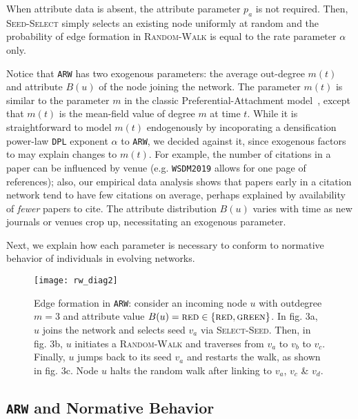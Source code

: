 When attribute data is absent, the attribute parameter $p_a$ is not required.
Then, \textsc{Seed-Select} simply selects an existing node uniformly at random
and the probability of edge formation in \textsc{Random-Walk} is equal to
the rate parameter $\alpha$ only.

Notice that \texttt{ARW} has two exogenous parameters:  the average out-degree $m(t)$ and attribute $B(u)$ of the node joining the network. The parameter $m(t)$ is similar to the parameter $m$ in the classic Preferential-Attachment model~\cite{barabasi1999emergence}, except that $m(t)$ is the mean-field value of degree $m$ at time $t$. While it is straightforward to model $m(t)$ endogenously by incoporating a densification power-law \texttt{DPL} exponent $\alpha$ to \texttt{ARW}, we decided against it, since exogenous factors to may explain changes to $m(t)$. For example, the number of citations in a paper can be influenced by venue (e.g. \texttt{WSDM2019} allows for one page of references); also, our empirical data analysis shows that papers early in a citation network tend to have few citations on average, perhaps explained by availability of \textit{fewer} papers to cite. The attribute distribution $B(u)$ varies with time as new journals or venues crop up, necessitating an exogenous parameter.



Next, we explain how each parameter is necessary to conform to normative
behavior of individuals in evolving networks.

\begin{figure*}
	\vspace{-20pt}
    \centering
    \texttt{[image: rw\_diag2]}
    \caption{Edge formation in \texttt{ARW}: consider
    an incoming node $u$ with outdegree ${m=3}$ and attribute value {$B(u)=\textsc{red} \in \{\textsc{red},\textsc{green}\}$}.
    In fig. 3a, $u$ joins the network and selects seed $v_a$ via \textsc{Select-Seed}.
    Then, in fig. 3b, $u$ initiates a \textsc{Random-Walk} and traverses from $v_a$ to $v_b$ to $v_c$.
    Finally, $u$ jumps back to its seed $v_a$ and restarts the walk, as shown in fig. 3c.
    Node $u$ halts the random walk after linking to $v_a$, $v_c$ \& $v_d$.
    }
    \label{fig:randomwalk}
	\vspace{-8pt}
\end{figure*}


\subsection{\texttt{ARW} and Normative Behavior}
\label{sub:Model Interpretation}


